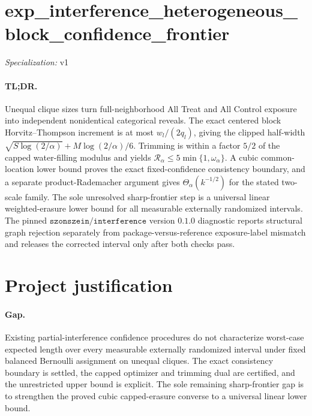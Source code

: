 \documentclass{article}
\begin{document}
\sloppy

\section*{exp\_\allowbreak{}interference\_\allowbreak{}heterogeneous\_\allowbreak{}block\_\allowbreak{}confidence\_\allowbreak{}frontier}

\noindent\textit{Specialization:} v1\par

\paragraph{TL;DR.} Unequal clique sizes turn full-neighborhood All Treat and All Control exposure into independent nonidentical categorical reveals. The exact centered block Horvitz--Thompson increment is at most \(w_l/(2q_l)\), giving the clipped half-width \(\sqrt{S\log(2/\alpha)}+M\log(2/\alpha)/6\). Trimming is within a factor \(5/2\) of the capped water-filling modulus and yields \(\mathcal R_\alpha\le5\min\{1,\omega_\alpha\}\). A cubic common-location lower bound proves the exact fixed-confidence consistency boundary, and a separate product-Rademacher argument gives \(\Theta_\alpha(k^{-1/2})\) for the stated two-scale family. The sole unresolved sharp-frontier step is a universal linear weighted-erasure lower bound for all measurable externally randomized intervals. The pinned \(\texttt{szonszein/interference}\) version \(0.1.0\) diagnostic reports structural graph rejection separately from package-versus-reference exposure-label mismatch and releases the corrected interval only after both checks pass.

\section{Project justification}

\paragraph{Gap.} Existing partial-interference confidence procedures do not characterize worst-case expected length over every measurable externally randomized interval under fixed balanced Bernoulli assignment on unequal cliques. The exact consistency boundary is settled, the capped optimizer and trimming dual are certified, and the unrestricted upper bound is explicit. The sole remaining sharp-frontier gap is to strengthen the proved cubic capped-erasure converse to a universal linear lower bound.
\end{document}
